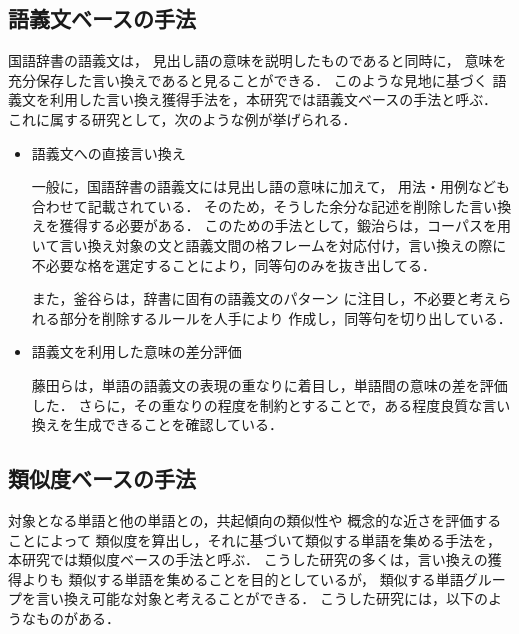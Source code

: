 \subsection{語義文ベースの手法}
\label{subsec:using description of word meaning}
国語辞書の語義文は，
見出し語の意味を説明したものであると同時に，
意味を充分保存した言い換えであると見ることができる．
このような見地に基づく
語義文を利用した言い換え獲得手法を，本研究では語義文ベースの手法と呼ぶ．
これに属する研究として，次のような例が挙げられる．
	   
\begin{itemize}
 \item 語義文への直接言い換え
	   
       一般に，国語辞書の語義文には見出し語の意味に加えて，
       用法・用例なども合わせて記載されている．
       そのため，そうした余分な記述を削除した言い換えを獲得する必要がある．
       このための手法として，鍛治ら\cite{kajichi}は，コーパスを用いて言い換え対象の文と語義文間の格フレームを対応付け，言い換えの際に不必要な格を選定することにより，同等句のみを抜き出してる．

       また，釜谷ら\cite{ipsj02}は，辞書に固有の語義文のパターン
       に注目し，不必要と考えられる部分を削除するルールを人手により
       作成し，同等句を切り出している．
	   
 \item 語義文を利用した意味の差分評価
	   
	   藤田ら\cite{fujita}は，単語の語義文の表現の重なりに着目し，単語間の意味の差を評価した．
       さらに，その重なりの程度を制約とすることで，ある程度良質な言い換えを生成できることを確認している．
\end{itemize}


\subsection{類似度ベースの手法}
対象となる単語と他の単語との，共起傾向の類似性や
概念的な近さを評価することによって
類似度を算出し，それに基づいて類似する単語を集める手法を，
本研究では類似度ベースの手法と呼ぶ．
こうした研究の多くは，言い換えの獲得よりも
類似する単語を集めることを目的としているが，
類似する単語グループを言い換え可能な対象と考えることができる．
こうした研究には，以下のようなものがある．

